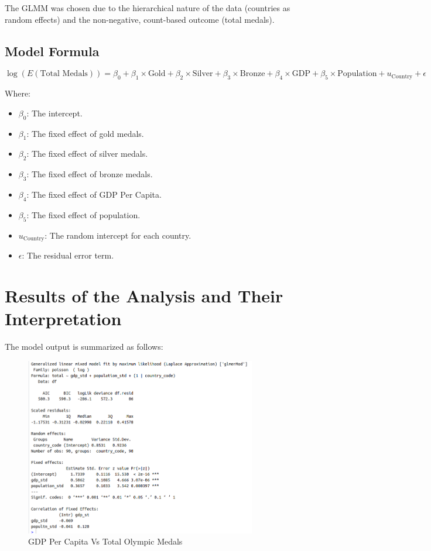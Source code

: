 \documentclass[a4paper,12pt]{article}
\begin{document}
The GLMM was chosen due to the hierarchical nature of the data (countries as random effects) and the non-negative, count-based outcome (total medals).

\subsection{Model Formula}

\begin{equation}
\log \left( E(\text{Total Medals}) \right) = \beta_0 + \beta_1 \times \text{Gold} + \beta_2 \times \text{Silver} + \beta_3 \times \text{Bronze} + \beta_4 \times \text{GDP} + \beta_5 \times \text{Population} + u_{\text{Country}} + \epsilon
\end{equation}

Where:
\begin{itemize}
    \item $\beta_0$: The intercept.
    \item $\beta_1$: The fixed effect of gold medals.
    \item $\beta_2$: The fixed effect of silver medals.
    \item $\beta_3$: The fixed effect of bronze medals.
    \item $\beta_4$: The fixed effect of GDP Per Capita.
    \item $\beta_5$: The fixed effect of population.
    \item $u_{\text{Country}}$: The random intercept for each country.
    \item $\epsilon$: The residual error term.
\end{itemize}

\section{Results of the Analysis and Their Interpretation}

The model output is summarized as follows:




\begin{figure}[H]
    \centering
    \includegraphics[width=0.9\textwidth]{images/summary.png}
    \caption{GDP Per Capita Vs Total Olympic Medals}
    \label{fig:dataset_fig_4}
\end{figure}
\end{document}
